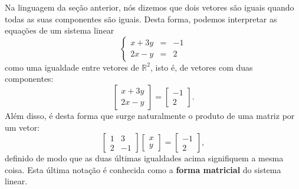 Na linguagem da seção anterior, nós dizemos que dois vetores são iguais quando todas as suas componentes são iguais. Desta forma, podemos interpretar as equações de um sistema linear
\begin{equation}
  \left\{
    \begin{array}{rcl}
      x+3y&=&-1 \\
      2x-y&=&2
    \end{array}
  \right.
\end{equation} como uma igualdade entre vetores de $\mathbb{R}^2$, isto é, de vetores com duas componentes:
\begin{equation}
  \left[
    \begin{array}{c}
      x+3y \\
      2x-y
    \end{array}
  \right] =
    \left[
    \begin{array}{c}
      -1 \\
      2
    \end{array}
  \right].
\end{equation} Além disso, é desta forma que surge naturalmente o produto de uma matriz por um vetor:
\begin{equation}
  \left[
    \begin{array}{cc}
      1 & 3 \\
      2 & -1
    \end{array}
  \right]
  \left[
    \begin{array}{c}
      x \\
      y
    \end{array}
  \right] =
    \left[
    \begin{array}{c}
      -1 \\
      2
    \end{array}
  \right],
\end{equation} definido de modo que as duas últimas igualdades acima signifiquem a mesma coisa. Esta última notação é conhecida como a \textbf{forma matricial} do sistema linear.




